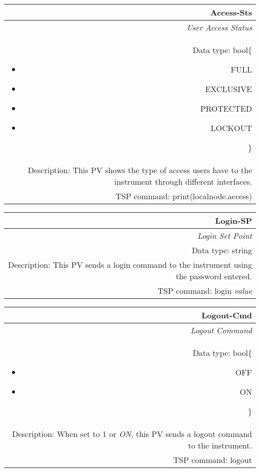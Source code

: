 \documentclass[openany]{article}
\begin{document}
		\begin{tabular}{N}
			\hline
			\bfseries Access-Sts\label{pv:access-sts} \\ \hline
			\emph{User Access Status} \\
			Data type: bool\{\begin{itemize}[noitemsep]
				\small
				\item[] FULL
				\item[] EXCLUSIVE
				\item[] PROTECTED
				\item[] LOCKOUT
			\end{itemize}\} \\
			Description: This PV shows the type of access users have to the instrument through different interfaces. \\
			TSP command: print(localnode.access)
		\end{tabular}

		\begin{tabular}{N}
			\hline
			\bfseries Login-SP\label{pv:login-sp} \\ \hline
			\emph{Login Set Point} \\
			Data type: string \\
			Description: This PV sends a login command to the instrument using the password entered. \\
			TSP command: login \emph{value}
		\end{tabular}

		\begin{tabular}{N}
			\hline
			\bfseries Logout-Cmd\label{pv:logout-cmd} \\ \hline
			\emph{Logout Command} \\
			Data type: bool\{\begin{itemize}[noitemsep]
				\small
				\item[] OFF
				\item[] ON
			\end{itemize}\} \\
			Description: When set to 1 or \emph{ON}, this PV sends a logout command to the instrument. \\
			TSP command: logout
		\end{tabular}
\end{document}
